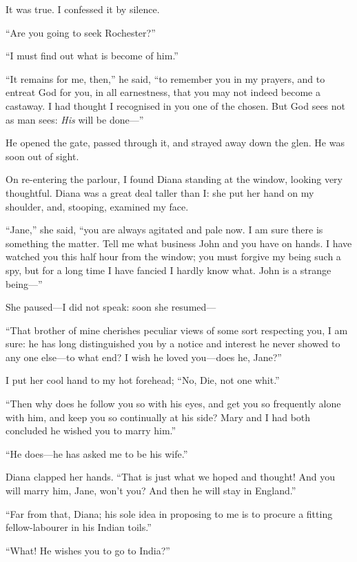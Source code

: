 It was true. I confessed it by silence.

\enquote{Are you going to seek \Mr{} Rochester?}

\enquote{I must find out what is become of him.}

\enquote{It remains for me, then,} he said, \enquote{to remember you in my
prayers, and to entreat God for you, in all earnestness, that you may
not indeed become a castaway. I had thought I recognised in you one of
the chosen. But God sees not as man sees: \emph{His} will be done---}

He opened the gate, passed through it, and strayed away down the glen. 
He was soon out of sight.

On re-entering the parlour, I found Diana standing at the window,
looking very thoughtful. Diana was a great deal taller than I: she put
her hand on my shoulder, and, stooping, examined my face.

\enquote{Jane,} she said, \enquote{you are always agitated and pale
now. I am sure there is something the matter. Tell me what business
\St{} John and you have on hands. I have watched you this half hour from
the window; you must forgive my being such a spy, but for a long time I
have fancied I hardly know what. \St{} John is a strange being---}

She paused---I did not speak: soon she resumed---

\enquote{That brother of mine cherishes peculiar views of some sort
respecting you, I am sure: he has long distinguished you by a notice and
interest he never showed to any one else---to what end? I wish he loved
you---does he, Jane?}

I put her cool hand to my hot forehead; \enquote{No, Die, not one whit.}

\enquote{Then why does he follow you so with his eyes, and get you so
frequently alone with him, and keep you so continually at his side? 
Mary and I had both concluded he wished you to marry him.}

\enquote{He does---he has asked me to be his wife.}

Diana clapped her hands. \enquote{That is just what we hoped and
thought! And you will marry him, Jane, won't you? And then he will
stay in England.}

\enquote{Far from that, Diana; his sole idea in proposing to me is to
procure a fitting fellow-labourer in his Indian toils.}

\enquote{What! He wishes you to go to India?}

